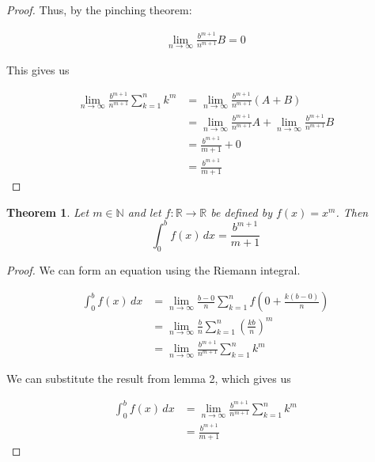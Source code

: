 \documentclass{article}
\newtheorem{theorem}{Theorem}
\begin{document}
\begin{proof}
Thus, by the pinching theorem:

\begin{align*}
\lim_{n \to \infty} \frac{b^{m+1}}{n^{m+1}} B = 0
\end{align*}

This gives us

\begin{align*}
\lim_{n \to \infty} \frac{b^{m+1}}{n^{m+1}} \sum_{k=1}^{n} k^{m} &= \lim_{n \to \infty} \frac{b^{m+1}}{n^{m+1}} (A + B) \\
&= \lim_{n \to \infty} \frac{b^{m+1}}{n^{m+1}} A + \lim_{n \to \infty} \frac{b^{m+1}}{n^{m+1}} B \\
&= \frac{b^{m+1}}{m+1} + 0 \\
&= \frac{b^{m+1}}{m+1} 
\end{align*}

\end{proof}

\begin{theorem}
Let $m \in \mathbb{N}$ and let $f: \mathbb{R} \to \mathbb{R}$ be defined by $f(x) = x^{m}$. Then
\begin{equation*}
\int_{0}^{b} f(x) \,dx  = \frac{b^{m+1}}{m+1}
\end{equation*}
\end{theorem}

\begin{proof}
We can form an equation using the Riemann integral.

\begin{align*}
\int_{0}^{b} f(x) \,dx &= \lim_{n \to \infty} \frac{b - 0}{n} \sum_{k=1}^{n} f(0 + \frac{k(b-0)}{n}) \\
&= \lim_{n \to \infty} \frac{b}{n} \sum_{k=1}^{n} \left( \frac{kb}{n} \right) ^{m} \\
&= \lim_{n \to \infty} \frac{b^{m+1}}{n^{m+1}} \sum_{k=1}^{n} k^{m}
\end{align*}

We can substitute the result from lemma 2, which gives us

\begin{align*}
\int_{0}^{b} f(x) \,dx &= \lim_{n \to \infty} \frac{b^{m+1}}{n^{m+1}} \sum_{k=1}^{n} k^{m} \\
&= \frac{b^{m+1}}{m+1}
\end{align*}

\end{proof}
\end{document}
